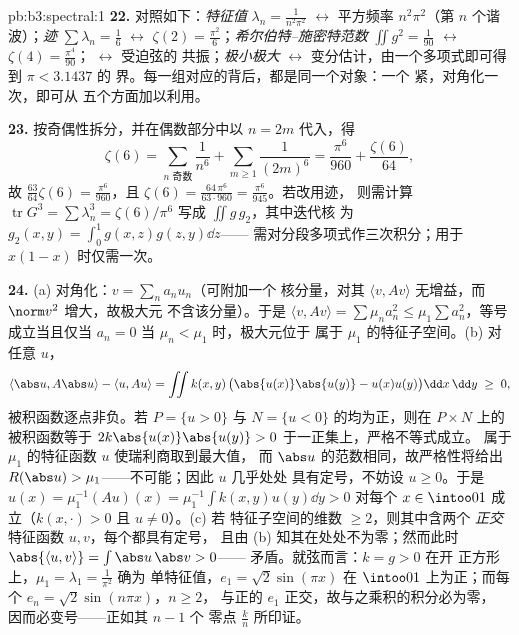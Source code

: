 \begin{solution}{pb:b3:spectral:1}
\textbf{22.} 对照如下：\emph{特征值} $\lambda_n =
\frac1{n^2\pi^2}$ $\leftrightarrow$ 平方频率
$n^2\pi^2$（第 $n$ 个谐波）；\emph{迹} $\sum
\lambda_n = \frac16$ $\leftrightarrow$ $\zeta(2) =
\frac{\pi^2}6$；\emph{希尔伯特–施密特范数} $\iint g^2 =
\frac1{90}$ $\leftrightarrow$ $\zeta(4) = \frac{\pi^4}{90}$；
\emph{} $\leftrightarrow$ 受迫弦的
共振；\emph{极小极大} $\leftrightarrow$
变分估计，由一个多项式即可得到 $\pi < 3.1437$ 的
界。每一组对应的背后，都是同一个对象：一个
紧，对角化一次，即可从
五个方面加以利用。

\textbf{23.} 按奇偶性拆分，并在偶数部分中以 $n = 2m$
代入，得
\[
\zeta(6) = \sum_{n\text{ 奇数}}\frac1{n^6} +
\sum_{m\geq1}\frac1{(2m)^6}
= \frac{\pi^6}{960} + \frac{\zeta(6)}{64},
\]
故 $\frac{63}{64}\zeta(6) = \frac{\pi^6}{960}$，且 $\zeta(6)
= \frac{64\,\pi^6}{63\cdot960} = \frac{\pi^6}{945}$。若改用迹，
则需计算 $\operatorname{tr}G^3 =
\sum\lambda_n^3 = \zeta(6)/\pi^6$ 写成 $\iint g\,g_2$，其中迭代核
为 $g_2(x,y) = \int_0^1g(x,z)g(z,y)\dd z$——
需对分段多项式作三次积分；用于 $x(1-x)$ 时仅需一次。

\textbf{24.} (a) 对角化：$v = \sum_na_nu_n$（可附加一个
核分量，对其 $\langle v, Av\rangle$
无增益，而 $\norm v^2$ 增大，故极大元
不含该分量）。于是 $\langle v, Av\rangle = \sum\mu_na_n^2 \leq
\mu_1\sum a_n^2$，等号成立当且仅当 $a_n = 0$
当 $\mu_n < \mu_1$ 时，极大元位于
属于 $\mu_1$ 的特征子空间。(b) 对任意 $u$，
\[
\langle\abs u, A\abs u\rangle - \langle u, Au\rangle
= \iint k(x,y)\,\bigl(\abs{u(x)}\abs{u(y)} -
u(x)u(y)\bigr)\dd x\,\dd y \;\geq\; 0,
\]
被积函数逐点非负。若 $P = \{u >
0\}$ 与 $N = \{u < 0\}$ 的均为正，则在
$P\times N$ 上的被积函数等于 $2k\abs{u(x)}\abs{u(y)} >
0$ 于一正集上，严格不等式成立。
属于 $\mu_1$ 的特征函数 $u$ 使瑞利商取到最大值，
而 $\abs u$ 的范数相同，故严格性将给出
$R(\abs u) > \mu_1$——不可能；因此 $u$ 几乎处处
具有定号，不妨设 $u \geq 0$。于是 $u(x) = \mu_1^{-1}(Au)(x) =
\mu_1^{-1}\int k(x,y)u(y)\dd y > 0$ 对每个 $x \in
\intoo01$ 成立（$k(x,\cdot) > 0$ 且 $u \neq 0$）。(c) 若
特征子空间的维数 $\geq 2$，则其中含两个
\emph{正交}特征函数 $u, v$，每个都具有定号，
且由 (b) 知其在处处不为零；然而此时
$\abs{\langle u, v\rangle} = \int\abs u\,\abs v > 0$——
矛盾。就弦而言：$k = g > 0$ 在开
正方形上，$\mu_1 = \lambda_1 = \frac1{\pi^2}$ 确为
单特征值，$e_1 = \sqrt2\sin(\pi x)$ 在
$\intoo01$ 上为正；而每个 $e_n = \sqrt2\sin(n\pi x)$，$n \geq 2$，
与正的 $e_1$ 正交，故与之乘积的积分必为零，
因而必变号——正如其 $n - 1$ 个
零点 $\frac kn$ 所印证。


\end{solution}
